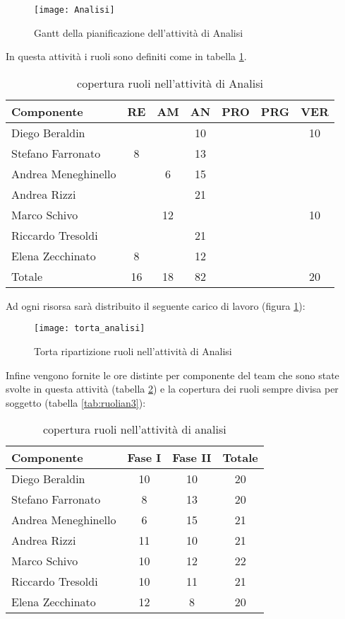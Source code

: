 \begin{figure}[h!]
  \texttt{[image: Analisi]}
\caption{Gantt della pianificazione dell'attività di Analisi}
\end{figure}
\clearpage
In questa attività i ruoli sono definiti come in tabella \ref{tab:ruolian}.
\begin{table}[h!]
\centering
\begin{tabular}{|l|c|c|c|c|c|c|}
\hline
Componente& RE& AM& AN& PRO& PRG& VER\\
\hline
Diego Beraldin & & & 10& & & 10\\
Stefano Farronato & 8& & 13& & & \\
Andrea Meneghinello & & 6& 15& & & \\
Andrea Rizzi & & & 21& & & \\
Marco Schivo & & 12& & & & 10\\
Riccardo Tresoldi & & & 21& & & \\
Elena Zecchinato & 8& & 12& & & \\
\hline
Totale & 16& 18& 82& & & 20\\
\hline
\end{tabular}
\caption{copertura ruoli nell'attività di Analisi}\label{tab:ruolian}
\end{table}

Ad ogni risorsa sarà distribuito il seguente carico di lavoro (figura \ref{fig:ruolian}):

\begin{figure}[h!]
\centering
  \texttt{[image: torta\_analisi]}
\caption{Torta ripartizione ruoli nell'attività di Analisi}\label{fig:ruolian}
\end{figure}
\clearpage

Infine vengono fornite le ore distinte per componente del team che sono state svolte in questa attività (tabella \ref{tab:ruolian2}) e la copertura dei ruoli sempre divisa per soggetto (tabella \ref{tab:ruolian3}):

\begin{table}[h!]
\centering
\begin{tabular}{|l|c|c|c|}
\hline
Componente& Fase I& Fase II& Totale\\
\hline
Diego Beraldin &10 &10 & 20\\
Stefano Farronato & 8& 13& 20\\
Andrea Meneghinello & 6& 15& 21\\
Andrea Rizzi & 11& 10& 21\\
Marco Schivo & 10& 12& 22\\
Riccardo Tresoldi & 10& 11& 21\\
Elena Zecchinato & 12& 8& 20\\
\hline
\end{tabular}
\caption{copertura ruoli nell'attività di analisi}\label{tab:ruolian2}
\end{table}


